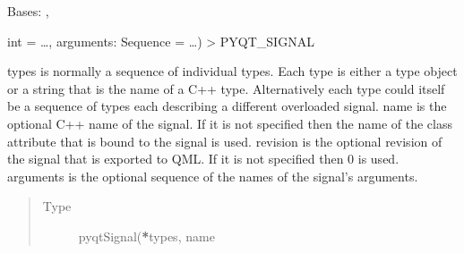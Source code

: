\documentclass[letterpaper,10pt,english]{sphinxmanual}
\begin{document}
\begin{fulllineitems}
\label{\detokenize{NoSeMazeControl/Windows:Windows.AppWindows.HardwareWindow}}
\pysigstartsignatures
{}
\pysigstopsignatures
\sphinxAtStartPar
Bases: , {\hyperref[\detokenize{NoSeMazeControl/Designs:Designs.hardwareWindow.Ui_MainWindow}]{}}

\begin{fulllineitems}
\label{\detokenize{NoSeMazeControl/Windows:Windows.AppWindows.HardwareWindow.change}}
\pysigstartsignatures
{}
\pysigstopsignatures
\end{fulllineitems}


\begin{fulllineitems}
\label{\detokenize{NoSeMazeControl/Windows:Windows.AppWindows.HardwareWindow.closeEvent}}
\pysigstartsignatures
{}
\pysigstopsignatures
\end{fulllineitems}


\begin{fulllineitems}
\label{\detokenize{NoSeMazeControl/Windows:Windows.AppWindows.HardwareWindow.new_pref}}
\pysigstartsignatures
{}
\pysigstopsignatures
\sphinxAtStartPar
int = …, arguments: Sequence = …) \sphinxhyphen{}\textgreater{} PYQT\_SIGNAL

\sphinxAtStartPar
types is normally a sequence of individual types.  Each type is either a
type object or a string that is the name of a C++ type.  Alternatively
each type could itself be a sequence of types each describing a different
overloaded signal.
name is the optional C++ name of the signal.  If it is not specified then
the name of the class attribute that is bound to the signal is used.
revision is the optional revision of the signal that is exported to QML.
If it is not specified then 0 is used.
arguments is the optional sequence of the names of the signal’s arguments.
\begin{quote}\begin{description}
\item[{Type}] \leavevmode
\sphinxAtStartPar
pyqtSignal({\color{red}\bfseries{}*}types, name


\end{description}
\end{quote}
\end{fulllineitems}
\end{fulllineitems}
\end{document}
